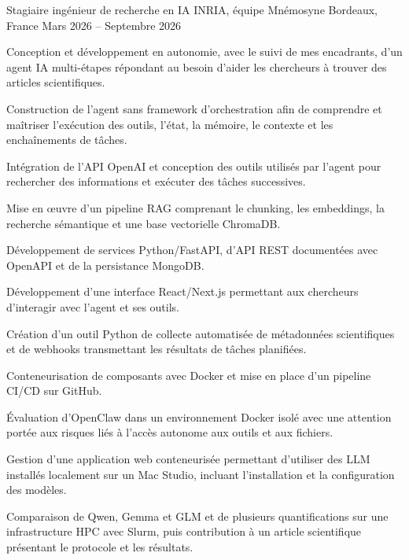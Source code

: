 
\begin{cventries}
  \cventry
    {Stagiaire ingénieur de recherche en IA}
    {INRIA, équipe Mnémosyne}
    {Bordeaux, France}
    {Mars 2026 -- Septembre 2026}
    {
      \begin{cvitems}
        \item {Conception et développement en autonomie, avec le suivi de mes encadrants, d’un agent IA multi-étapes répondant au besoin d’aider les chercheurs à trouver des articles scientifiques.}
        \item {Construction de l’agent sans framework d’orchestration afin de comprendre et maîtriser l’exécution des outils, l’état, la mémoire, le contexte et les enchaînements de tâches.}
        \item {Intégration de l’API OpenAI et conception des outils utilisés par l’agent pour rechercher des informations et exécuter des tâches successives.}
        \item {Mise en œuvre d’un pipeline RAG comprenant le chunking, les embeddings, la recherche sémantique et une base vectorielle ChromaDB.}
        \item {Développement de services Python/FastAPI, d’API REST documentées avec OpenAPI et de la persistance MongoDB.}
        \item {Développement d’une interface React/Next.js permettant aux chercheurs d’interagir avec l’agent et ses outils.}
        \item {Création d’un outil Python de collecte automatisée de métadonnées scientifiques et de webhooks transmettant les résultats de tâches planifiées.}
        \item {Conteneurisation de composants avec Docker et mise en place d’un pipeline CI/CD sur GitHub.}
        \item {Évaluation d’OpenClaw dans un environnement Docker isolé avec une attention portée aux risques liés à l’accès autonome aux outils et aux fichiers.}
        \item {Gestion d’une application web conteneurisée permettant d’utiliser des LLM installés localement sur un Mac Studio, incluant l’installation et la configuration des modèles.}
        \item {Comparaison de Qwen, Gemma et GLM et de plusieurs quantifications sur une infrastructure HPC avec Slurm, puis contribution à un article scientifique présentant le protocole et les résultats.}
      \end{cvitems}
    }


\end{cventries}
